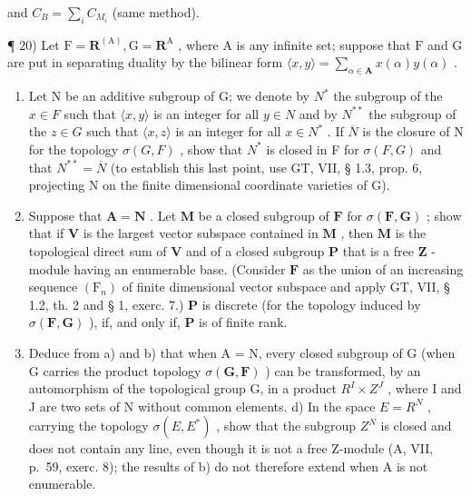 and \(C_B = \sum_i C_{M_i}\) (same method).

¶ 20) Let \(\mathrm{F} = \mathbf{R}^{(\mathrm{A})}, \mathrm{G} = \mathbf{R}^{\mathrm{A}}\) , where \(\mathrm{A}\) is any infinite set; suppose that \(\mathrm{F}\) and \(\mathrm{G}\) are put in separating duality by the bilinear form \(\langle x, y \rangle = \sum_{\alpha \in \mathbf{A}} x(\alpha) y(\alpha)\) .

\begin{enumerate}
\def\labelenumi{\alph{enumi})}
\item
  Let N be an additive subgroup of G; we denote by \(N^{*}\) the subgroup of the \(x \in F\) such that \(\langle x, y \rangle\) is an integer for all \(y \in N\) and by \(N^{**}\) the subgroup of the \(z \in G\) such that \(\langle x, z \rangle\) is an integer for all \(x \in N^{*}\) . If \(\overline{N}\) is the closure of N for the topology \(\sigma(G, F)\) , show that \(N^{*}\) is closed in F for \(\sigma(F, G)\) and that \(N^{**} = \overline{N}\) (to establish this last point, use GT, VII, § 1.3, prop. 6, projecting N on the finite dimensional coordinate varieties of G).
\item
  Suppose that \(\mathbf{A} = \mathbf{N}\) . Let \(\mathbf{M}\) be a closed subgroup of \(\mathbf{F}\) for \(\sigma(\mathbf{F},\mathbf{G})\) ; show that if \(\mathbf{V}\) is the largest vector subspace contained in \(\mathbf{M}\) , then \(\mathbf{M}\) is the topological direct sum of \(\mathbf{V}\) and of a closed subgroup \(\mathbf{P}\) that is a free \(\mathbf{Z}\) -module having an enumerable base. (Consider \(\mathbf{F}\) as the union of an increasing sequence \((\mathrm{F}_n)\) of finite dimensional vector subspace and apply GT, VII, § 1.2, th. 2 and § 1, exerc. 7.) \(\mathbf{P}\) is discrete (for the topology induced by \(\sigma(\mathbf{F},\mathbf{G})\) ), if, and only if, \(\mathbf{P}\) is of finite rank.
\item
  Deduce from a) and b) that when A = N, every closed subgroup of G (when G carries the product topology \(\sigma(\mathbf{G}, \mathbf{F})\) ) can be transformed, by an automorphism of the topological group G, in a product \(R^{I} \times Z^{J}\) , where I and J are two sets of N without common elements. d) In the space \(E = R^{N}\) , carrying the topology \(\sigma(E, E^{*})\) , show that the subgroup \(Z^{N}\) is closed and does not contain any line, even though it is not a free Z-module (A, VII, p.~59, exerc. 8); the results of b) do not therefore extend when A is not enumerable.
\end{enumerate}

